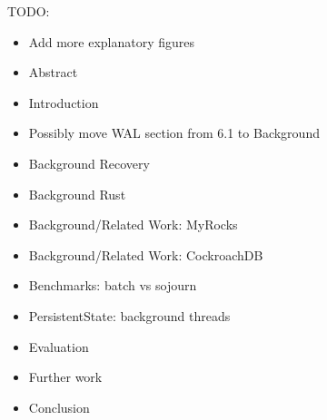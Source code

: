 \color{purple}
TODO:
\begin{itemize}
  \item Add more explanatory figures

  \item Abstract
  \item Introduction

  \item Possibly move WAL section from 6.1 to Background

  \item Background Recovery
  \item Background Rust

  \item Background/Related Work: MyRocks
  \item Background/Related Work: CockroachDB

  \item Benchmarks: batch vs sojourn

  \item PersistentState: background threads

  \item Evaluation
  \item Further work
  \item Conclusion
\end{itemize}

